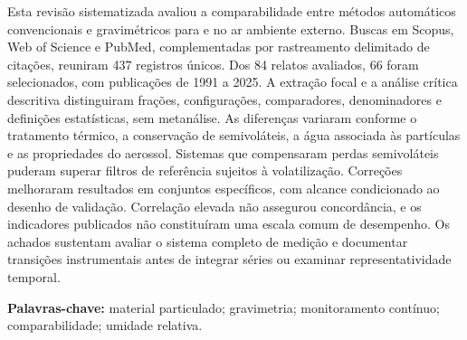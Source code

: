 \noindent Esta revisão sistematizada avaliou a comparabilidade entre métodos automáticos convencionais e gravimétricos para \MPdez{} e \MPdoiscinco{} no ar ambiente externo. Buscas em Scopus, Web of Science e PubMed, complementadas por rastreamento delimitado de citações, reuniram 437 registros únicos. Dos 84 relatos avaliados, 66 foram selecionados, com publicações de 1991 a 2025. A extração focal e a análise crítica descritiva distinguiram frações, configurações, comparadores, denominadores e definições estatísticas, sem metanálise. As diferenças variaram conforme o tratamento térmico, a conservação de semivoláteis, a água associada às partículas e as propriedades do aerossol. Sistemas que compensaram perdas semivoláteis puderam superar filtros de referência sujeitos à volatilização. Correções melhoraram resultados em conjuntos específicos, com alcance condicionado ao desenho de validação. Correlação elevada não assegurou concordância, e os indicadores publicados não constituíram uma escala comum de desempenho. Os achados sustentam avaliar o sistema completo de medição e documentar transições instrumentais antes de integrar séries ou examinar representatividade temporal.
\par\vspace{.5em}
\noindent\textbf{Palavras-chave:} material particulado; gravimetria; monitoramento contínuo; comparabilidade; umidade relativa.\par
